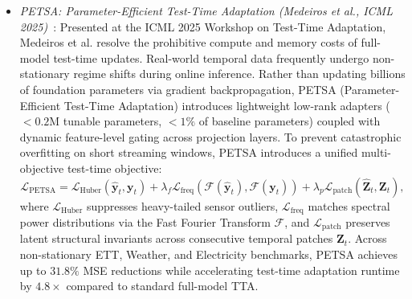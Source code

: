 \begin{itemize}[leftmargin=*]
    \item \emph{PETSA: Parameter-Efficient Test-Time Adaptation (Medeiros et al., ICML 2025)}~\cite{medeiros2025petsa}: Presented at the ICML 2025 Workshop on Test-Time Adaptation, Medeiros et al. resolve the prohibitive compute and memory costs of full-model test-time updates. Real-world temporal data frequently undergo non-stationary regime shifts during online inference. Rather than updating billions of foundation parameters via gradient backpropagation, PETSA (Parameter-Efficient Test-Time Adaptation) introduces lightweight low-rank adapters ($<0.2\text{M}$ tunable parameters, $<1\%$ of baseline parameters) coupled with dynamic feature-level gating across projection layers. To prevent catastrophic overfitting on short streaming windows, PETSA introduces a unified multi-objective test-time objective:
    \begin{equation}
        \mathcal{L}_{\text{PETSA}} = \mathcal{L}_{\text{Huber}}(\hat{\mathbf{y}}_t, \mathbf{y}_t) + \lambda_f \mathcal{L}_{\text{freq}}(\mathcal{F}(\hat{\mathbf{y}}_t), \mathcal{F}(\mathbf{y}_t)) + \lambda_p \mathcal{L}_{\text{patch}}(\hat{\mathbf{Z}}_t, \mathbf{Z}_t),
    \end{equation}
    where $\mathcal{L}_{\text{Huber}}$ suppresses heavy-tailed sensor outliers, $\mathcal{L}_{\text{freq}}$ matches spectral power distributions via the Fast Fourier Transform $\mathcal{F}$, and $\mathcal{L}_{\text{patch}}$ preserves latent structural invariants across consecutive temporal patches $\mathbf{Z}_t$. Across non-stationary ETT, Weather, and Electricity benchmarks, PETSA achieves up to $31.8\%$ MSE reductions while accelerating test-time adaptation runtime by $4.8\times$ compared to standard full-model TTA.


\end{itemize}
